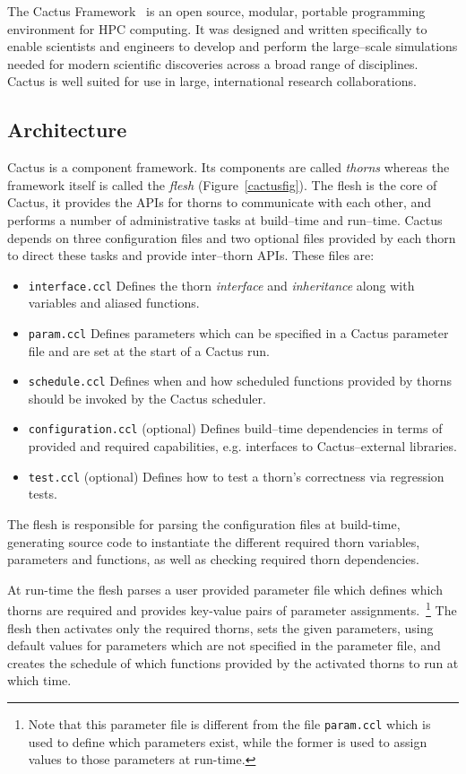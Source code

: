 \documentclass[conference]{IEEEtran}
\begin{document}
The Cactus Framework~\cite{Cactusweb,Goodale02a} is an open source, modular, portable programming environment 
for HPC computing. It was designed and written specifically to enable scientists and engineers to 
develop and perform the large--scale simulations needed for modern scientific discoveries across
 a broad range of disciplines. Cactus is well suited for use in large, international research collaborations.

\subsection{Architecture}
\label{cactusarchitecture}

Cactus is a component framework. Its components are called {\it thorns} whereas the 
framework itself is called the {\it flesh} (Figure~\ref{cactusfig}). 
The flesh is the core of Cactus, it provides the APIs for thorns to communicate with each other,
and performs a number of administrative tasks at build--time and run--time. Cactus depends on three
configuration files and two optional files provided by each thorn to direct these tasks and provide inter--thorn APIs. These  files are:
\begin{itemize}
\item{\texttt{interface.ccl}} Defines the thorn {\it interface} and {\it inheritance} along with variables and aliased functions.
\item{\texttt{param.ccl}} Defines parameters which can be specified in a Cactus parameter file and are set at the start of a Cactus run.
\item{\texttt{schedule.ccl}} Defines when and how scheduled functions provided by thorns should be invoked by the Cactus scheduler.
\item{\texttt{configuration.ccl} (optional)} Defines build--time dependencies in terms of provided and required capabilities, e.g. interfaces to Cactus--external libraries.
\item{\texttt{test.ccl} (optional)} Defines how to test a thorn's correctness via regression tests.
\end{itemize}

The flesh is responsible for parsing the configuration files at build-time, generating source code  to 
instantiate the different required thorn variables, parameters and functions,  
as well as checking required thorn dependencies.


At run-time the flesh parses a user provided parameter file which defines which
thorns are required and provides key-value pairs of parameter assignments.~\footnote{Note that
this parameter file is different from the file {\texttt{param.ccl}} which is used to define which
parameters exist, while the former is used to assign values to those parameters at run-time.}
The flesh then activates only the required thorns,
 sets the given parameters, using default values for parameters which are not specified in the parameter file, 
 and creates the schedule of which functions provided by the activated thorns to run at which time. 
\end{document}
